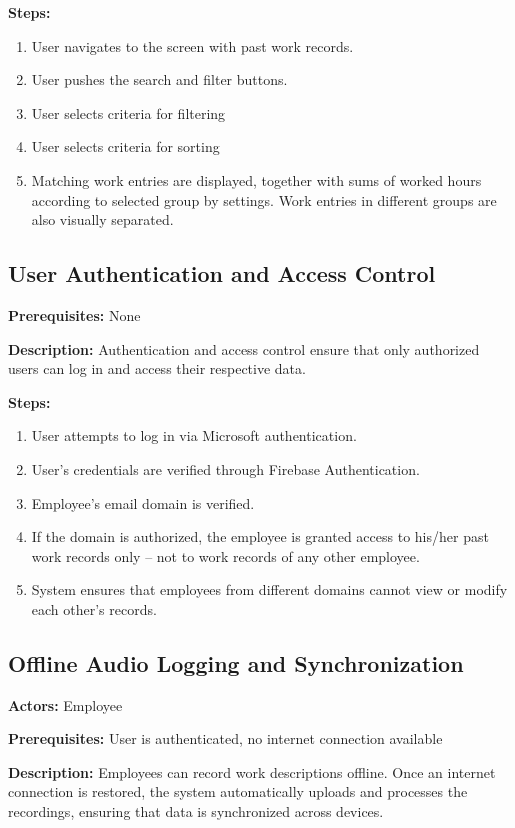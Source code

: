 \documentclass[
  digital,     %
  oneside,     %
  nosansbold,  %
  nocolorbold, %
  lof,         %
  lot,         %
]{fithesis4}
\begin{document}
\noindent \textbf{Steps:}
\begin{enumerate}
    \item User navigates to the screen with past work records.
    \item User pushes the search and filter buttons.
    \item User selects criteria for filtering
    \item User selects criteria for sorting
    \item Matching work entries are displayed, together with sums of worked hours according to selected group by settings. Work entries in different groups are also visually separated. 
\end{enumerate}

\subsection{User Authentication and Access Control}

\noindent \textbf{Prerequisites:} None

\noindent \textbf{Description:}  
Authentication and access control ensure that only authorized users can log in and access their respective data.

\noindent \textbf{Steps:}
\begin{enumerate}
    \item User attempts to log in via Microsoft authentication.
    \item User's credentials are verified through Firebase Authentication.
    \item Employee’s email domain is verified.
    \item If the domain is authorized, the employee is granted access to his/her past work records only – not to work records of any other employee.
    \item System ensures that employees from different domains cannot view or modify each other's records.
\end{enumerate}

\subsection{Offline Audio Logging and Synchronization}

\noindent \textbf{Actors:} Employee

\noindent \textbf{Prerequisites:} User is authenticated, no internet connection available

\noindent \textbf{Description:}  
Employees can record work descriptions offline. Once an internet connection is restored, the system automatically uploads and processes the recordings, ensuring that data is synchronized across devices.
\end{document}
